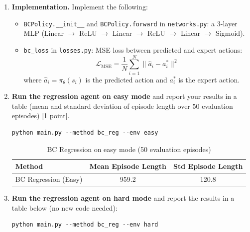 \documentclass[12pt]{article}
\begin{document}
\begin{enumerate}

\item \textbf{Implementation.} Implement the following:
\begin{itemize}
    \item \texttt{BCPolicy.\_\_init\_\_} and \texttt{BCPolicy.forward} in \texttt{networks.py}: a 3-layer MLP (Linear $\to$ ReLU $\to$ Linear $\to$ ReLU $\to$ Linear $\to$ Sigmoid).
    \item \texttt{bc\_loss} in \texttt{losses.py}: MSE loss between predicted and expert actions:
    \begin{equation}
        \mathcal{L}_{\text{MSE}} = \frac{1}{N} \sum_{i=1}^{N} \| \hat{a}_i - a_i^* \|^2
    \end{equation}
    where $\hat{a}_i = \pi_\theta(s_i)$ is the predicted action and $a_i^*$ is the expert action.
\end{itemize}

\item \textbf{Run the regression agent on easy mode} and report your results in a table (mean and standard deviation of episode length over 50 evaluation episodes) [1 point].

\begin{tcolorbox}[width=\linewidth, sharp corners=all, colback=white!95!black]
\begin{verbatim}
python main.py --method bc_reg --env easy
\end{verbatim}
\end{tcolorbox}

\begin{table}[h]
\centering
\begin{tabular}{lcc}
\hline
\textbf{Method} & \textbf{Mean Episode Length} & \textbf{Std Episode Length} \\
\hline
BC Regression (Easy) & 959.2 & 120.8 \\
\hline
\end{tabular}
\caption{BC Regression on easy mode (50 evaluation episodes)}
\end{table}

\item \textbf{Run the regression agent on hard mode} and report the results in a table below (no new code needed):

\begin{tcolorbox}[width=\linewidth, sharp corners=all, colback=white!95!black]
\begin{verbatim}
python main.py --method bc_reg --env hard
\end{verbatim}
\end{tcolorbox}


\end{enumerate}
\end{document}
